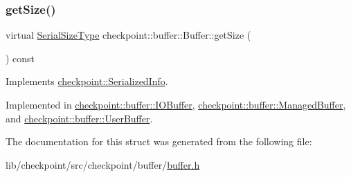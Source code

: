 \subsubsection{\texorpdfstring{get\+Size()}{getSize()}}
{\footnotesize\ttfamily virtual \hyperlink{namespacecheckpoint_a083f6674da3f94c2901b18c6d238217c}{Serial\+Size\+Type} checkpoint\+::buffer\+::\+Buffer\+::get\+Size (\begin{DoxyParamCaption}{ }\end{DoxyParamCaption}) const\hspace{0.3cm}{\ttfamily [pure virtual]}}



Implements \hyperlink{structcheckpoint_1_1_serialized_info_a7550340904d20dd612100fb37d1d4452}{checkpoint\+::\+Serialized\+Info}.



Implemented in \hyperlink{structcheckpoint_1_1buffer_1_1_i_o_buffer_a65774dab5b6397ae40b77282729fde2f}{checkpoint\+::buffer\+::\+I\+O\+Buffer}, \hyperlink{structcheckpoint_1_1buffer_1_1_managed_buffer_a26f85bcd885624b7c0ad6fd8572ad466}{checkpoint\+::buffer\+::\+Managed\+Buffer}, and \hyperlink{structcheckpoint_1_1buffer_1_1_user_buffer_a434e7feda041957509ee08791d3f4949}{checkpoint\+::buffer\+::\+User\+Buffer}.



The documentation for this struct was generated from the following file\+:\begin{DoxyCompactItemize}
\item 
lib/checkpoint/src/checkpoint/buffer/\hyperlink{buffer_8h}{buffer.\+h}\end{DoxyCompactItemize}
